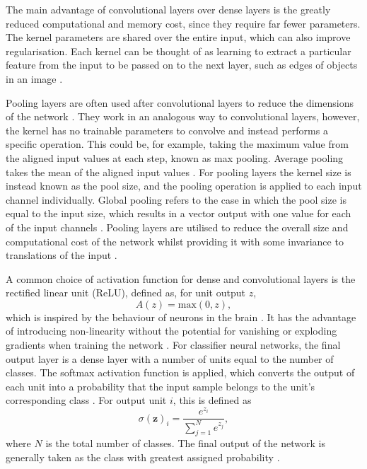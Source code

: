 \documentclass[12pt]{article}
\begin{document}
The main advantage of convolutional layers over dense layers is the greatly reduced computational and memory cost, since they require far fewer parameters. The kernel parameters are shared over the entire input, which can also improve regularisation. Each kernel can be thought of as learning to extract a particular feature from the input to be passed on to the next layer, such as edges of objects in an image \cite{Goodfellow16}.

Pooling layers are often used after convolutional layers to reduce the dimensions of the network \cite{Goodfellow16}. They work in an analogous way to convolutional layers, however, the kernel has no trainable parameters to convolve and instead performs a specific operation. This could be, for example, taking the maximum value from the aligned input values at each step, known as max pooling. Average pooling takes the mean of the aligned input values \cite{Aghdam17}. For pooling layers the kernel size is instead known as the pool size, and the pooling operation is applied to each input channel individually. Global pooling refers to the case in which the pool size is equal to the input size, which results in a vector output with one value for each of the input channels \cite{Aghdam17}. Pooling layers are utilised to reduce the overall size and computational cost of the network whilst providing it with some invariance to translations of the input \cite{Goodfellow16, Aghdam17}.

A common choice of activation function for dense and convolutional layers is the rectified linear unit (ReLU), defined as, for unit output $z$,
\begin{equation}
A(z)=\mathrm{max}(0, z), \label{relu}
\end{equation}
which is inspired by the behaviour of neurons in the brain \cite{Glorot11}. It has the advantage of introducing non-linearity without the potential for vanishing or exploding gradients when training the network \cite{Goodfellow16, Glorot11}. For classifier neural networks, the final output layer is a dense layer with a number of units equal to the number of classes. The softmax activation function is applied, which converts the output of each unit into a probability that the input sample belongs to the unit's corresponding class \cite{Goodfellow16}. For output unit $i$, this is defined as
\begin{equation}
\sigma(\bm{z})_i=\frac{e^{z_i}}{\sum_{j=1}^Ne^{z_j}}, \label{softmax}
\end{equation}
where $N$ is the total number of classes. The final output of the network is generally taken as the class with greatest assigned probability \cite{Goodfellow16}.
\end{document}
